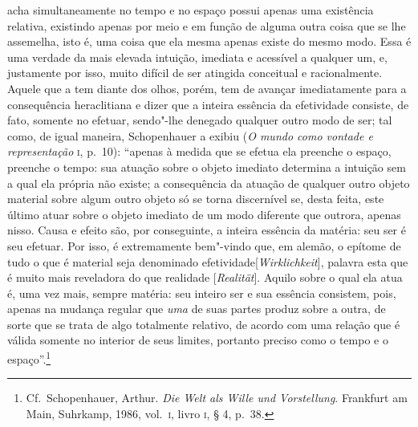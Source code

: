 acha simultaneamente no tempo e no espaço possui apenas uma existência
relativa, existindo apenas por meio e em função de alguma outra coisa que se
lhe assemelha, isto é, uma coisa que ela mesma apenas existe do mesmo modo.
Essa é uma verdade da mais elevada intuição, imediata e acessível a qualquer
um, e, justamente por isso, muito difícil de ser atingida conceitual e
racionalmente. Aquele que a tem diante dos olhos, porém, tem de avançar
imediatamente para a consequência heraclitiana e dizer que a inteira essência
da efetividade consiste, de fato, somente no efetuar, sendo"-lhe denegado
qualquer outro modo de ser; tal como, de igual maneira, Schopenhauer a
exibiu (\textit{O mundo como vontade e representação} \textsc{i}, p.~10):
``apenas à medida que se efetua ela preenche o espaço, preenche o tempo: sua
atuação sobre o objeto imediato determina a intuição sem a qual ela própria
não existe; a consequência da atuação de qualquer outro objeto material sobre
algum outro objeto só se torna discernível se, desta feita, este último atuar
sobre o objeto imediato de um modo diferente que outrora, apenas nisso. Causa
e efeito são, por conseguinte, a inteira essência da matéria: seu ser é seu
efetuar. Por isso, é extremamente bem"-vindo que, em alemão, o epítome de
tudo o que é material seja denominado efetividade[\textit{Wirklichkeit}], 
palavra esta que é muito mais reveladora do que realidade [\textit{Realität}]. 
Aquilo sobre o qual ela atua é, uma vez mais, sempre
matéria: seu inteiro ser e sua essência consistem, pois, apenas na mudança
regular que \textit{uma} de suas partes produz sobre a outra, de sorte que se
trata de algo totalmente relativo, de acordo com uma relação que é válida
somente no interior de seus limites, portanto preciso como o tempo e o
espaço''.\footnote{Cf.~Schopenhauer, Arthur. \textit{Die Welt als Wille und
Vorstellung}. Frankfurt am Main, Suhrkamp, 1986, vol.~\textsc{i}, livro \textsc{i}, 
§ 4, p.~38.}

